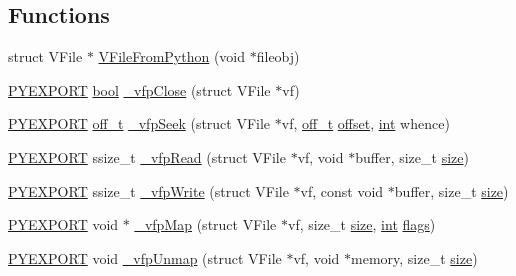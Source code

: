 \subsection*{Functions}
\begin{DoxyCompactItemize}
\item 
struct V\+File $\ast$ \mbox{\hyperlink{vfs-py_8h_a2c8828e68e769f2b3de7641e6d12feea}{V\+File\+From\+Python}} (void $\ast$fileobj)
\item 
\mbox{\hyperlink{pycommon_8h_a68eebefd6b08dcf3f0bc2b2fe43a32b6}{P\+Y\+E\+X\+P\+O\+RT}} \mbox{\hyperlink{libretro_8h_a4a26dcae73fb7e1528214a068aca317e}{bool}} \mbox{\hyperlink{vfs-py_8h_ae0039b5b72d18431cca2887c89919ebf}{\+\_\+vfp\+Close}} (struct V\+File $\ast$vf)
\item 
\mbox{\hyperlink{pycommon_8h_a68eebefd6b08dcf3f0bc2b2fe43a32b6}{P\+Y\+E\+X\+P\+O\+RT}} \mbox{\hyperlink{__builder_8h_a53066be3c3a28d8b8ccb3dc95c1e49b1}{off\+\_\+t}} \mbox{\hyperlink{vfs-py_8h_a380762c464d50d10fdc08748f362e3e5}{\+\_\+vfp\+Seek}} (struct V\+File $\ast$vf, \mbox{\hyperlink{__builder_8h_a53066be3c3a28d8b8ccb3dc95c1e49b1}{off\+\_\+t}} \mbox{\hyperlink{ioapi_8h_a601c4660e8a1a14a1b87fe387e934d19}{offset}}, \mbox{\hyperlink{ioapi_8h_a787fa3cf048117ba7123753c1e74fcd6}{int}} whence)
\item 
\mbox{\hyperlink{pycommon_8h_a68eebefd6b08dcf3f0bc2b2fe43a32b6}{P\+Y\+E\+X\+P\+O\+RT}} ssize\+\_\+t \mbox{\hyperlink{vfs-py_8h_aa6b61d85bba817d5ccc6b31c15440735}{\+\_\+vfp\+Read}} (struct V\+File $\ast$vf, void $\ast$buffer, size\+\_\+t \mbox{\hyperlink{ioapi_8h_a014d89bd76f74ef3a29c8f04b473eb76}{size}})
\item 
\mbox{\hyperlink{pycommon_8h_a68eebefd6b08dcf3f0bc2b2fe43a32b6}{P\+Y\+E\+X\+P\+O\+RT}} ssize\+\_\+t \mbox{\hyperlink{vfs-py_8h_a1f6b6c31b8f6b50179ba3f7030dc8f55}{\+\_\+vfp\+Write}} (struct V\+File $\ast$vf, const void $\ast$buffer, size\+\_\+t \mbox{\hyperlink{ioapi_8h_a014d89bd76f74ef3a29c8f04b473eb76}{size}})
\item 
\mbox{\hyperlink{pycommon_8h_a68eebefd6b08dcf3f0bc2b2fe43a32b6}{P\+Y\+E\+X\+P\+O\+RT}} void $\ast$ \mbox{\hyperlink{vfs-py_8h_aaa63f5159220e10a3deeb11dbed544e2}{\+\_\+vfp\+Map}} (struct V\+File $\ast$vf, size\+\_\+t \mbox{\hyperlink{ioapi_8h_a014d89bd76f74ef3a29c8f04b473eb76}{size}}, \mbox{\hyperlink{ioapi_8h_a787fa3cf048117ba7123753c1e74fcd6}{int}} \mbox{\hyperlink{lr35902_2decoder_8c_a11f29eea941556f0630cfd3285f565c0}{flags}})
\item 
\mbox{\hyperlink{pycommon_8h_a68eebefd6b08dcf3f0bc2b2fe43a32b6}{P\+Y\+E\+X\+P\+O\+RT}} void \mbox{\hyperlink{vfs-py_8h_a8e07b0e17503c8a4d583587cdf5864f5}{\+\_\+vfp\+Unmap}} (struct V\+File $\ast$vf, void $\ast$memory, size\+\_\+t \mbox{\hyperlink{ioapi_8h_a014d89bd76f74ef3a29c8f04b473eb76}{size}})

\end{DoxyCompactItemize}
